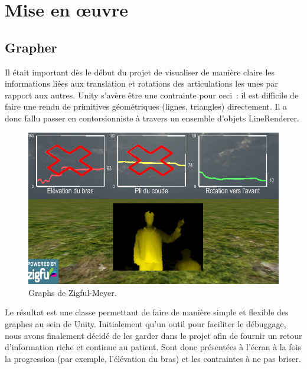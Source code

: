 \section{Mise en œuvre}

\subsection{Grapher}
Il était important dès le début du projet de visualiser de manière claire les 
informations liées aux translation et rotations des articulations les unes par 
rapport aux autres. Unity s'avère être une contrainte pour ceci~: il est difficile
de faire une rendu de primitives géométriques (lignes, triangles) directement. Il
a donc fallu passer en contorsionniste à travers un ensemble d'objets LineRenderer.

\begin{figure}[h!]
\centering
\includegraphics[width=\linewidth]{images/zfm_graph}
\caption{Graphs de Zigful-Meyer.}
\end{figure}

Le résultat est une classe permettant de faire de manière simple et flexible des
graphes au sein de Unity. Initialement qu'un outil pour faciliter le 
débuggage, nous avons finalement décidé de les garder dans le projet afin de
fournir un retour d'information riche et continue au patient. Sont donc présentées 
à l'écran à la fois la progression (par exemple, l'élévation du bras) et les 
contraintes à ne pas briser.
    
